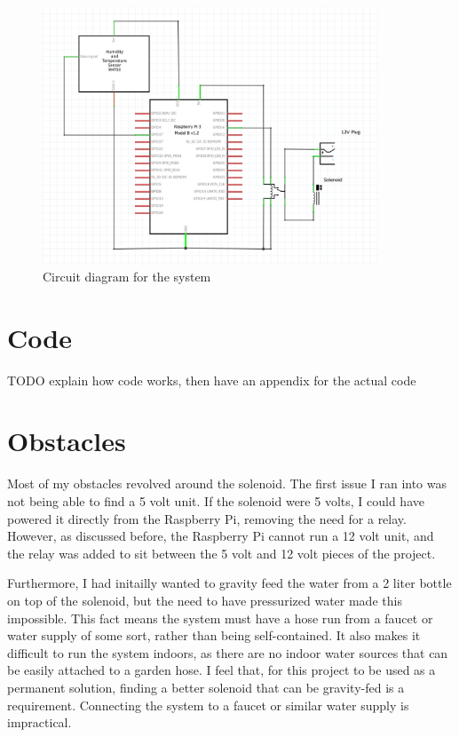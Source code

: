\documentclass[11pt] {article}
\begin{document}
\begin{figure}[H]
    \begin{centering}
        \includegraphics[width=10cm]{../img/circuit}
        \caption{Circuit diagram for the system}
    \end{centering}
\end{figure}

\section{Code}
TODO explain how code works, then have an appendix for the actual code %

\section{Obstacles}
Most of my obstacles revolved around the solenoid. The first issue I ran into was not being able to find a 5 volt unit.
If the solenoid were 5 volts, I could have powered it directly from the Raspberry Pi, removing the need for a relay.
However, as discussed before, the Raspberry Pi cannot run a 12 volt unit, and the relay was added to sit between the
5 volt and 12 volt pieces of the project.

Furthermore, I had initailly wanted to gravity feed the water from a 2 liter bottle on top of the solenoid, but the
need to have pressurized water made this impossible. This fact means the system must have a hose run from a faucet or
water supply of some sort, rather than being self-contained. It also makes it difficult to run the system indoors, as
there are no indoor water sources that can be easily attached to a garden hose. I feel that, for this project to be
used as a permanent solution, finding a better solenoid that can be gravity-fed is a requirement. Connecting the system
to a faucet or similar water supply is impractical.
\end{document}
